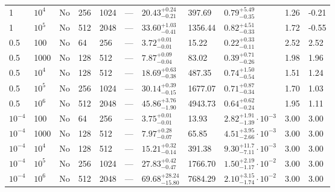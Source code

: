 \documentclass[aps, pre, onecolumn, nofootinbib, notitlepage, groupedaddress, amsfonts, amssymb, amsmath, longbibliography]{revtex4-1}
\begin{document}
\begin{center}
\begin{longtable}{ p{1cm} p{1cm} p{1cm} p{1cm} p{1cm} p{1cm} p{1.75cm} p{1.5cm} p{2.75cm} p{1cm} p{1.2cm}  }
\vspace{0.08cm}1	&	$10^4$	&	No	&	256	&	1024	&	---	&$	20.43	_{-	0.21	}^{+	0.24	}$&	397.69	&$	0.79	_{-	0.35	}^{+	5.49	}$&	1.26	&	-0.21	\\
\vspace{0.08cm}1	&	$10^5$	&	No	&	512	&	2048	&	---	&$	33.60	_{-	0.41	}^{+	1.03	}$&	1356.44	&$	0.82	_{-	0.33	}^{+	4.51	}$&	1.72	&	-0.55	\\
\vspace{0.08cm}0.5	&	100	&	No	&	64	&	256	&	---	&$	3.72	_{-	0.01	}^{+	0.01	}$&	15.22	&$	0.22	_{-	0.11	}^{+	0.33	}$&	2.52	&	2.52	\\
\vspace{0.08cm}0.5	&	1000	&	No	&	128	&	512	&	---	&$	7.87	_{-	0.04	}^{+	0.09	}$&	83.02	&$	0.39	_{-	0.26	}^{+	0.71	}$&	1.98	&	1.96	\\
\vspace{0.08cm}0.5	&	$10^4$	&	No	&	128	&	512	&	---	&$	18.69	_{-	0.38	}^{+	0.63	}$&	487.35	&$	0.74	_{-	0.54	}^{+	1.50	}$&	1.51	&	1.24	\\
\vspace{0.08cm}0.5	&	$10^5$	&	No	&	256	&	1024	&	---	&$	30.14	_{-	0.15	}^{+	0.39	}$&	1677.07	&$	0.71	_{-	0.34	}^{+	0.87	}$&	1.70	&	1.03	\\
\vspace{0.08cm}0.5	&	$10^6$	&	No	&	512	&	2048	&	---	&$	45.86	_{-	1.90	}^{+	3.76	}$&	4943.73	&$	0.64	_{-	0.24	}^{+	0.62	}$&	1.95	&	1.11	\\
\vspace{0.08cm}$10^{-4}$	&	100	&	No	&	64	&	256	&	---	&$	3.75	_{-	0.01	}^{+	0.01	}$&	13.93	&$	2.82	_{-	1.39	}^{+	1.91}\cdot 10^{-3}	$&	3.00	&	3.00	\\
\vspace{0.08cm}$10^{-4}$	&	1000	&	No	&	128	&	512	&	---	&$	7.97	_{-	0.07	}^{+	0.28	}$&	65.85	&$	4.51	_{-	2.66	}^{+	3.95}\cdot 10^{-3}	$&	3.00	&	3.00	\\
\vspace{0.08cm}$10^{-4}$	&	$10^4$	&	No	&	128	&	512	&	---	&$	15.21	_{-	0.14	}^{+	0.32	}$&	391.38	&$	9.30	_{-	7.11	}^{+	11.7}\cdot 10^{-3}	$&	3.00	&	3.00	\\
\vspace{0.08cm}$10^{-4}$	&	$10^5$	&	No	&	256	&	1024	&	---	&$	27.83	_{-	0.47	}^{+	0.42	}$&	1766.70	&$	1.50	_{-	1.17	}^{+	2.19}\cdot 10^{-2}	$&	3.00	&	3.00	\\
\vspace{0.08cm}$10^{-4}$	&	$10^6$	&	No	&	512	&	2048	&	---	&$	69.68	_{-	15.80	}^{+	28.24	}$&	7684.29	&$	2.10	_{-	1.74	}^{+	3.15}\cdot 10^{-2}	$&	3.00	&	3.00	\\

\end{longtable}
\end{center}
\end{document}
